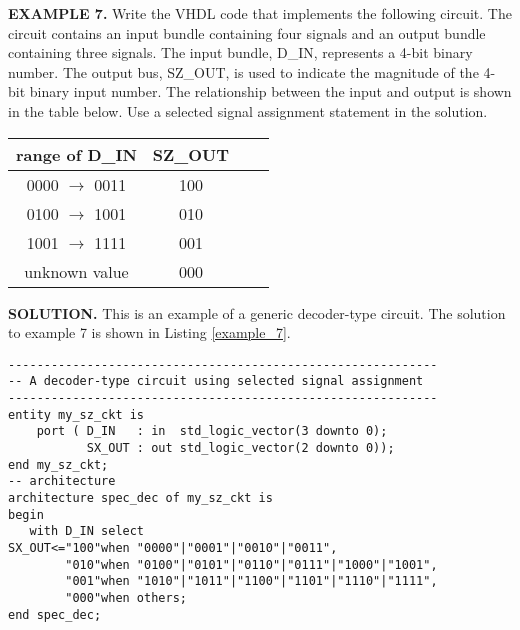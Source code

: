\begin{leftbar}
\noindent
\textbf{EXAMPLE 7.} Write the VHDL code that implements the following circuit. The circuit contains an input bundle containing four signals and an output bundle containing three signals. The input bundle, D\_IN, represents a 4-bit binary number. The output bus, SZ\_OUT, is used to indicate the magnitude of the 4-bit binary input number. The relationship between the input and output is shown in the table below. Use a selected signal assignment statement in the solution.

\centering\vspace{5pt}
\begin{tabular}{c*{2}{c}r}
range of D\_IN  & SZ\_OUT \\
\hline
0000 $\rightarrow$ 0011 & 100 \\
0100 $\rightarrow$ 1001 & 010 \\
1001 $\rightarrow$ 1111 & 001 \\
unknown value		& 000 \\
\end{tabular}
\end{leftbar}
\noindent
\textbf{SOLUTION.} This is an example of a generic decoder-type circuit. The solution to example 7 is shown in Listing \ref{example_7}.

\begin{minipage}{1\linewidth}
\centering
{}
\end{minipage}
\begin{minipage}{1\linewidth}
\begin{lstlisting}[label=example_7, caption=Solution of example 7.]
------------------------------------------------------------
-- A decoder-type circuit using selected signal assignment
------------------------------------------------------------
entity my_sz_ckt is
    port ( D_IN   : in  std_logic_vector(3 downto 0);
           SX_OUT : out std_logic_vector(2 downto 0)); 
end my_sz_ckt;
-- architecture
architecture spec_dec of my_sz_ckt is
begin
   with D_IN select
SX_OUT<="100"when "0000"|"0001"|"0010"|"0011", 
        "010"when "0100"|"0101"|"0110"|"0111"|"1000"|"1001", 
        "001"when "1010"|"1011"|"1100"|"1101"|"1110"|"1111", 
        "000"when others;  
end spec_dec;
\end{lstlisting}
\end{minipage}

